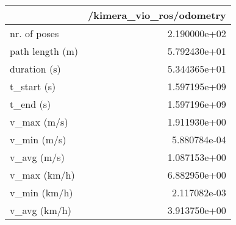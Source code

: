 \begin{tabular}{lr}
\toprule
{} &  /kimera\_vio\_ros/odometry \\
\midrule
nr. of poses    &              2.190000e+02 \\
path length (m) &              5.792430e+01 \\
duration (s)    &              5.344365e+01 \\
t\_start (s)     &              1.597195e+09 \\
t\_end (s)       &              1.597196e+09 \\
v\_max (m/s)     &              1.911930e+00 \\
v\_min (m/s)     &              5.880784e-04 \\
v\_avg (m/s)     &              1.087153e+00 \\
v\_max (km/h)    &              6.882950e+00 \\
v\_min (km/h)    &              2.117082e-03 \\
v\_avg (km/h)    &              3.913750e+00 \\
\bottomrule
\end{tabular}
